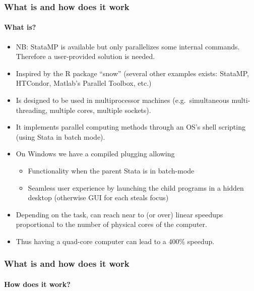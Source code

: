 \documentclass[9pt,\ExtraDocOpts]{beamer}
\begin{document}
\begin{frame} %
\frametitle{What is and how does it work}
\framesubtitle{What is?}

\begin{itemize}
\item NB: StataMP is available but only parallelizes some internal commands. Therefore a user-provided solution is needed.\pause{}
\item Inspired by the R package ``snow'' (several other examples exists: StataMP, HTCondor, Matlab's Parallel Toolbox, etc.)\pause{}
\item Is designed to be used in multiprocessor machines (e.g.\ simultaneous multi-threading, multiple cores, multiple sockets).\pause{}
\item It implements parallel computing methods through an OS's shell scripting (using Stata in batch mode).\pause{}
\item On Windows we have a compiled plugging allowing\pause{}
\begin{itemize}
\item Functionality when the parent Stata is in batch-mode\pause{}
\item Seamless user experience by launching the child programs in a hidden desktop (otherwise GUI for each steals focus)\pause{}
\end{itemize}
\item Depending on the task, can reach near to (or over) linear speedups proportional to the number of physical cores of the computer.\pause{}
\item Thus having a quad-core computer can lead to a 400\% speedup.
\end{itemize}

\end{frame}

\begin{frame}[b]
\frametitle{What is and how does it work}
\framesubtitle{How does it work?}
\begin{figure}
\centering
\scalebox{.65}{}
\end{figure}
\end{frame}
\end{document}
